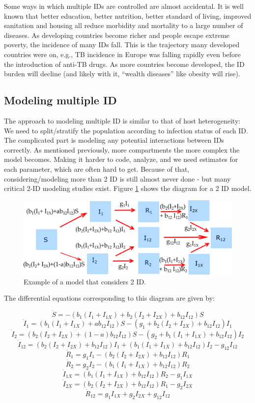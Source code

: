 \documentclass[]{article}
\theoremstyle{definition}
\theoremstyle{definition}
\theoremstyle{definition}
\theoremstyle{remark}
\begin{document}
Some ways in which multiple IDs are controlled are almost accidental. It
is well known that better education, better nutrition, better standard
of living, improved sanitation and housing all reduce morbidity and
mortality to a large number of diseases. As developing countries become
richer and people escape extreme poverty, the incidence of many IDs
fall. This is the trajectory many developed countries were on, e.g., TB
incidence in Europe was falling rapidly even before the introduction of
anti-TB drugs. As more countries become developed, the ID burden will
decline (and likely with it, ``wealth diseases'' like obesity will
rise).

\subsection{Modeling multiple ID}\label{myadvancedbox}

The approach to modeling multiple ID is similar to that of host
heterogeneity: We need to split/stratify the population according to
infection status of each ID. The complicated part is modeling any
potential interactions between IDs correctly. As mentioned previously,
more compartments the more complex the model becomes. Making it harder
to code, analyze, and we need estimates for each parameter, which are
often hard to get. Because of that, considering/modeling more than 2 ID
is still almost never done - but many critical 2-ID modeling studies
exist. Figure \ref{fig:coinfection} shows the diagram for a 2 ID model.

\begin{figure}
\centering
\includegraphics{./images/multipathogenmodel.png}
\caption{\label{fig:coinfection}Example of a model that considers 2 ID.}
\end{figure}

The differential equations corresponding to this diagram are given by:

\[\dot S =  -  (b_{1} (I_1+I_{1X}) + b_{2} (I_2+I_{2X}) + b_{12}I_{12}) S  \]
\[\dot I_1 =   (b_{1} (I_1+I_{1X}) + ab_{12} I_{12})S - (g_1  + b_{2} (I_2+I_{2X})  + b_{12}  I_{12}) I_1\]
\[\dot I_2 =   (b_{2} (I_2+I_{2X}) +  (1-a) b_{12} I_{12})S - (g_2 + b_{1}(I_1 + I_{1X}) + b_{12} I_{12}) I_2\]
\[\dot I_{12} = (b_{2} (I_2+I_{2X})  + b_{12}  I_{12}) I_1 + (b_{1}(I_1 + I_{1X}) + b_{12} I_{12}) I_2  - g_{12} I_{12}\]
\[\dot R_1 = g_1 I_1 - (b_2 (I_2 + I_{2X}) + b_{12}  I_{12}) R_1\]
\[\dot R_2 = g_2 I_2 - (b_1 (I_1 + I_{1X}) + b_{12}  I_{12}) R_2\]
\[\dot I_{1X} = (b_1 (I_1 + I_{1X}) + b_{12}  I_{12}) R_2 - g_{1} I_{1X}\]
\[\dot I_{2X} = (b_2 (I_2 + I_{2X}) + b_{12}  I_{12}) R_1 - g_{2} I_{2X}\]
\[\dot R_{12} = g_{1} I_{1X} + g_{2} I_{2X} + g_{12} I_{12} \]
\end{document}
